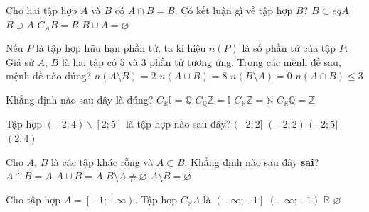 \begin{ex}%
	Cho hai tập hợp $A$ và $B$ có $A\cap B=B$. Có  kết luận gì về tập hợp $B$?
	\choice 
		 {\True $B\subset eq A$}
		{$B\supset A$} 
		 {$C_AB=B$}
		 {$B\cup A=\varnothing$}
\end{ex}

\begin{ex}%
	Nếu $P$ là tập hợp hữu hạn phần tử, ta kí hiệu $n(P)$ là số phần tử của tập $P$. Giả sử $A$, $B$ là hai tập có $5$ và $3$ phần tử tương ứng. Trong  các mệnh đề sau, mệnh đề nào đúng?
	 \choice
		{$n\left(A\setminus B\right)=2$} 
		{$n\left(A\cup  B\right)=8$}
		{$n\left(B\setminus A\right)=0$} 
		 {\True $n\left(A\cap B\right)\leq 3$}
\end{ex}

\begin{ex}%
	Khẳng định nào sau đây  là đúng?
	\choice 
		 {\True $C_{\mathbb{R}}\mathbb{I}=\mathbb{Q}$}
		{$C_{\mathbb{Q}}\mathbb{Z}=\mathbb{I}$} 
		{$C_{\mathbb{R}}\mathbb{Z}=\mathbb{N}$} 
		{$C_{\mathbb{R}}\mathbb{Q}=\mathbb{Z}$} 
\end{ex}

\begin{ex}%
	Tập hợp $(-2; 4) \backslash[2; 5]$ là tập hợp nào sau  đây?
	\choice 
		{$(-2; 2]$} 
		{\True $(-2; 2)$} 
		{$(-2;  5]$}
		 {$(2; 4)$}
\end{ex}

\begin{ex}%
	Cho $A$, $B$ là các tập khác rỗng và $A\subset B$. Khẳng định nào sau đây \textbf{sai}? 
	\choice 
		 {$A\cap B=A$}
		 {\True $A\cup B=A$}
		{$B\setminus  A\ne \varnothing$}
		{$A\setminus  B=\varnothing$}
\end{ex}

\begin{ex}%
	Cho tập  hợp $A=\left[-1;+\infty\right)$. Tập hợp $C_{\mathbb{R}} A$ là
	 \choice
		 {$\left(-\infty;-1\right]$}
		 {\True $\left(-\infty;-1\right)$}
		{$\mathbb{R}$} 
		{$\varnothing$} 
\end{ex}

